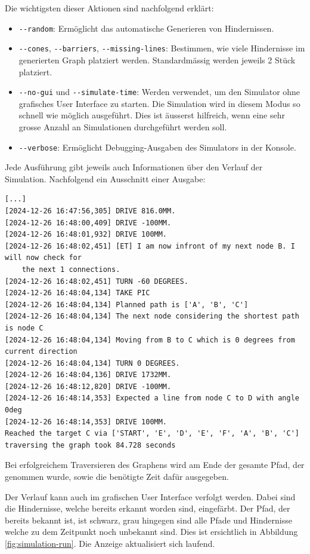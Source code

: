 Die wichtigsten dieser Aktionen sind nachfolgend erklärt:

\begin{itemize}
    \item \verb|--random|: Ermöglicht das automatische Generieren von Hindernissen.
    \item \verb|--cones|, \verb|--barriers|, \verb|--missing-lines|: Bestimmen, wie viele Hindernisse im generierten Graph platziert werden. Standardmässig werden jeweils 2 Stück platziert.
    \item \verb|--no-gui| und \verb|--simulate-time|: Werden verwendet, um den Simulator ohne grafisches User Interface zu starten. Die Simulation wird in diesem Modus so schnell wie möglich ausgeführt. Dies ist äusserst hilfreich, wenn eine sehr grosse Anzahl an Simulationen durchgeführt werden soll.
    \item \verb|--verbose|: Ermöglicht Debugging-Ausgaben des Simulators in der Konsole.
\end{itemize}

Jede Ausführung gibt jeweils auch Informationen über den Verlauf der Simulation. Nachfolgend ein Ausschnitt einer Ausgabe:

\begin{footnotesize}
\begin{verbatim}
[...]
[2024-12-26 16:47:56,305] DRIVE 816.0MM.
[2024-12-26 16:48:00,409] DRIVE -100MM.
[2024-12-26 16:48:01,932] DRIVE 100MM.
[2024-12-26 16:48:02,451] [ET] I am now infront of my next node B. I will now check for 
    the next 1 connections.
[2024-12-26 16:48:02,451] TURN -60 DEGREES.
[2024-12-26 16:48:04,134] TAKE PIC
[2024-12-26 16:48:04,134] Planned path is ['A', 'B', 'C']
[2024-12-26 16:48:04,134] The next node considering the shortest path is node C
[2024-12-26 16:48:04,134] Moving from B to C which is 0 degrees from current direction
[2024-12-26 16:48:04,134] TURN 0 DEGREES.
[2024-12-26 16:48:04,136] DRIVE 1732MM.
[2024-12-26 16:48:12,820] DRIVE -100MM.
[2024-12-26 16:48:14,353] Expected a line from node C to D with angle 0deg
[2024-12-26 16:48:14,353] DRIVE 100MM.
Reached the target C via ['START', 'E', 'D', 'E', 'F', 'A', 'B', 'C']
traversing the graph took 84.728 seconds
\end{verbatim}
\end{footnotesize}

Bei erfolgreichem Traversieren des Graphens wird am Ende der gesamte Pfad, der genommen wurde, sowie die benötigte Zeit dafür ausgegeben.

Der Verlauf kann auch im grafischen User Interface verfolgt werden. Dabei sind die Hindernisse, welche bereits erkannt worden sind, eingefärbt. Der Pfad, der bereits bekannt ist, ist schwarz, grau hingegen sind alle Pfade und Hindernisse welche zu dem Zeitpunkt noch unbekannt sind. Dies ist ersichtlich in Abbildung \ref{fig:simulation-run}.
Die Anzeige aktualisiert sich laufend.

